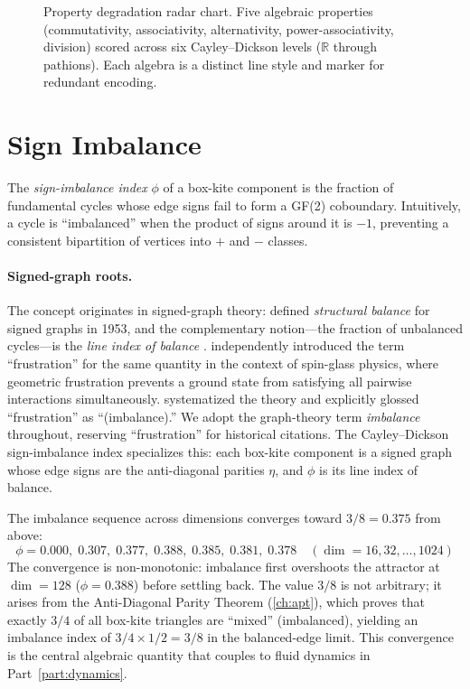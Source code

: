 \documentclass[12pt,openany]{report}
\theoremstyle{definition}
\theoremstyle{plain}
\theoremstyle{remark}
\begin{document}
\begin{figure}[htbp]
\centering

\caption{Property degradation radar chart.  Five algebraic properties
(commutativity, associativity, alternativity, power-associativity,
division) scored across six Cayley--Dickson levels ($\mathbb{R}$ through
pathions).  Each algebra is a distinct line style and marker for
redundant encoding.}
\label{fig:radar-props}
\end{figure}

\section{Sign Imbalance}
\label{sec:sign-imbalance}

The \emph{sign-imbalance index} $\phi$ of a box-kite component is the
fraction of fundamental cycles whose edge signs fail to form a GF(2)
coboundary.  Intuitively, a cycle is ``imbalanced'' when the product
of signs around it is $-1$, preventing a consistent bipartition of
vertices into $+$ and $-$ classes.

\paragraph{Signed-graph roots.}
The concept originates in signed-graph theory: \citet{Harary1953Balance}
defined \emph{structural balance} for signed graphs in 1953, and the
complementary notion---the fraction of unbalanced cycles---is the
\emph{line index of balance} \citep{Aref2020FrustrationIndex}.
\citet{Toulouse1977Frustration} independently introduced the term
``frustration'' for the same quantity in the context of spin-glass
physics, where geometric frustration prevents a ground state from
satisfying all pairwise interactions simultaneously.
\citet{Zaslavsky1982SignedGraphs} systematized the theory and
explicitly glossed ``frustration'' as ``(imbalance).''  We adopt the
graph-theory term \emph{imbalance} throughout, reserving
``frustration'' for historical citations.  The Cayley--Dickson
sign-imbalance index specializes this: each box-kite component is a
signed graph whose edge signs are the anti-diagonal parities $\eta$,
and $\phi$ is its line index of balance.

The imbalance sequence across dimensions converges toward
$3/8 = 0.375$ from above:
\begin{equation}
  \phi = 0.000,\; 0.307,\; 0.377,\; 0.388,\; 0.385,\; 0.381,\; 0.378
  \quad (\dim = 16, 32, \ldots, 1024)
  \label{eq:imbalance-index}
\end{equation}
The convergence is non-monotonic: imbalance first overshoots the
attractor at $\dim = 128$ ($\phi = 0.388$) before settling back.
The value $3/8$ is not arbitrary; it arises from the Anti-Diagonal
Parity Theorem (\cref{ch:apt}), which proves that exactly $3/4$ of all
box-kite triangles are ``mixed'' (imbalanced), yielding an imbalance
index of $3/4 \times 1/2 = 3/8$ in the balanced-edge limit.
This convergence is the central algebraic quantity that couples to
fluid dynamics in Part~\ref{part:dynamics}.
\end{document}
